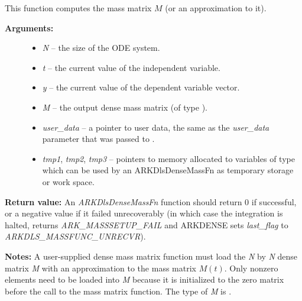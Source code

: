 \documentclass[letterpaper,10pt,english]{sphinxmanual}
\begin{document}
\begin{fulllineitems}
\label{c_interface/User_supplied:c.ARKDlsDenseMassFn}
This function computes the mass matrix \(M\) (or an approximation to it).
\begin{description}
\item[{\textbf{Arguments:}}] \leavevmode\begin{itemize}
\item {} 
\emph{N} -- the size of the ODE system.

\item {} 
\emph{t} -- the current value of the independent variable.

\item {} 
\emph{y} -- the current value of the dependent variable vector.

\item {} 
\emph{M} -- the output dense mass matrix (of type ).

\item {} 
\emph{user\_data} -- a pointer to user data, the same as the
\emph{user\_data} parameter that was passed to {\hyperref[c_interface/User_callable:c.ARKodeSetUserData]{\emph{}}}.

\item {} 
\emph{tmp1}, \emph{tmp2}, \emph{tmp3} -- pointers to memory allocated to
variables of type  which can be used by an
ARKDlsDenseMassFn as temporary storage or work space.

\end{itemize}

\end{description}

\textbf{Return value:}
An \emph{ARKDlsDenseMassFn} function should return 0 if
successful, or a negative value if it failed unrecoverably (in
which case the integration is halted, {\hyperref[c_interface/User_callable:c.ARKode]{\emph{}}} returns
\emph{ARK\_MASSSETUP\_FAIL} and ARKDENSE sets \emph{last\_flag} to
\emph{ARKDLS\_MASSFUNC\_UNRECVR}).

\textbf{Notes:} A user-supplied dense mass matrix function must load the
\emph{N} by \emph{N} dense matrix \emph{M} with an approximation to the mass matrix
\(M(t)\). Only nonzero elements need to be loaded into \emph{M}
because it is initialized to the zero matrix before the call
to the mass matrix function. The type of \emph{M} is .


\end{fulllineitems}
\end{document}
